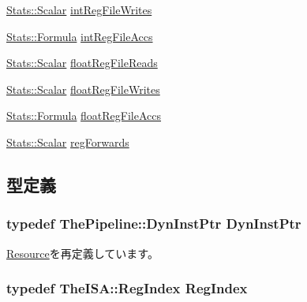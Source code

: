 \begin{DoxyCompactItemize}
\item 
\hyperlink{classStats_1_1Scalar}{Stats::Scalar} \hyperlink{classUseDefUnit_aa79e36dab324cdcb339de91d5b21f03b}{intRegFileWrites}
\item 
\hyperlink{classStats_1_1Formula}{Stats::Formula} \hyperlink{classUseDefUnit_abf73f69eb2ade79a3b55b431699c6d07}{intRegFileAccs}
\item 
\hyperlink{classStats_1_1Scalar}{Stats::Scalar} \hyperlink{classUseDefUnit_a51481d49e9355c25c8afa3553771605d}{floatRegFileReads}
\item 
\hyperlink{classStats_1_1Scalar}{Stats::Scalar} \hyperlink{classUseDefUnit_a5b7ee045b5715d8abb9d7e17502e6f09}{floatRegFileWrites}
\item 
\hyperlink{classStats_1_1Formula}{Stats::Formula} \hyperlink{classUseDefUnit_a71fd5719f07c55c81f0296e2835a7c90}{floatRegFileAccs}
\item 
\hyperlink{classStats_1_1Scalar}{Stats::Scalar} \hyperlink{classUseDefUnit_a37cb2ded859693943151bfb454bcc97f}{regForwards}
\end{DoxyCompactItemize}


\subsection{型定義}
\hypertarget{classUseDefUnit_af9d0c8a46736ba6aa2d8bb94da1a5e73}{
\subsubsection[{DynInstPtr}]{\setlength{\rightskip}{0pt plus 5cm}typedef {\bf ThePipeline::DynInstPtr} {\bf DynInstPtr}}}
\label{classUseDefUnit_af9d0c8a46736ba6aa2d8bb94da1a5e73}


\hyperlink{classResource_af9d0c8a46736ba6aa2d8bb94da1a5e73}{Resource}を再定義しています。\hypertarget{classUseDefUnit_a36d25e03e43fa3bb4c5482cbefe5e0fb}{
\subsubsection[{RegIndex}]{\setlength{\rightskip}{0pt plus 5cm}typedef TheISA::RegIndex {\bf RegIndex}}}
\label{classUseDefUnit_a36d25e03e43fa3bb4c5482cbefe5e0fb}


